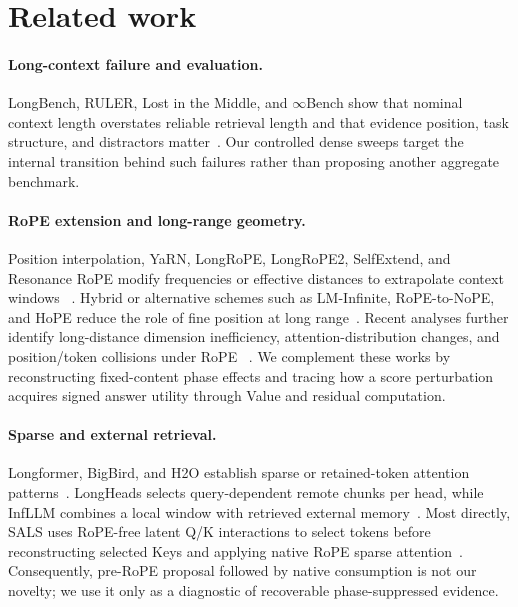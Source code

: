 \section{Related work}
\label{sec:related}

\paragraph{Long-context failure and evaluation.}
LongBench, RULER, Lost in the Middle, and $\infty$Bench show that nominal
context length overstates reliable retrieval length and that evidence position,
task structure, and distractors matter~\citep{bai2024longbench,hsieh2024ruler,
liu2024lost,zhang2024inftybench}.  Our controlled dense sweeps target the
internal transition behind such failures rather than proposing another
aggregate benchmark.

\paragraph{RoPE extension and long-range geometry.}
Position interpolation, YaRN, LongRoPE, LongRoPE2, SelfExtend, and Resonance
RoPE modify frequencies or effective distances to extrapolate context windows
~\citep{chen2023positioninterpolation,peng2024yarn,ding2024longrope,
shang2025longrope2,jin2024selfextend,wang2024resonance}.  Hybrid or alternative
schemes such as LM-Infinite, RoPE-to-NoPE, and HoPE reduce the role of fine
position at long range~\citep{han2024lminfinite,yang2025rnope,chen2025hope}.
Recent analyses further identify long-distance dimension inefficiency,
attention-distribution changes, and position/token collisions under RoPE
~\citep{chiang2025dimension,zhong2025understanding,du2026rope}.  We complement
these works by reconstructing fixed-content phase effects and tracing how a
score perturbation acquires signed answer utility through Value and residual
computation.

\paragraph{Sparse and external retrieval.}
Longformer, BigBird, and H2O establish sparse or retained-token attention
patterns~\citep{beltagy2020longformer,zaheer2020bigbird,zhang2023h2o}.
LongHeads selects query-dependent remote chunks per head, while InfLLM combines
a local window with retrieved external memory~\citep{lu2024longheads,
xiao2024infllm}.  Most directly, SALS uses RoPE-free latent Q/K interactions to
select tokens before reconstructing selected Keys and applying native RoPE
sparse attention~\citep{mu2025sals}.  Consequently, pre-RoPE proposal followed
by native consumption is not our novelty; we use it only as a diagnostic of
recoverable phase-suppressed evidence.


